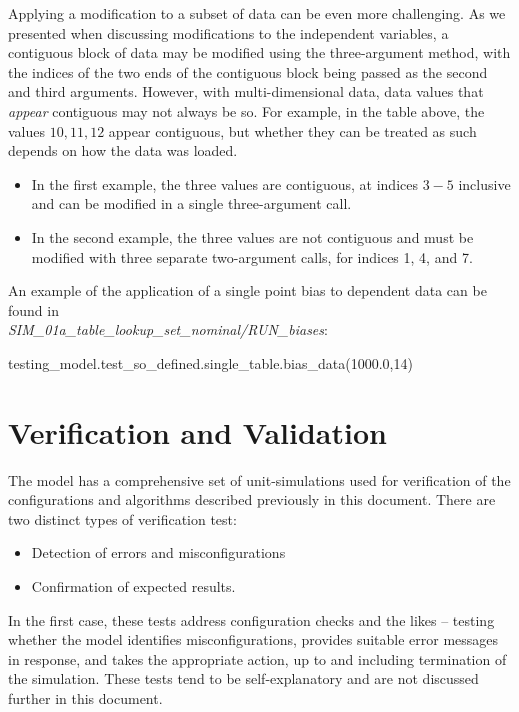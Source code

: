 \documentclass[11pt,fleqn]{report}
\begin{document}
Applying a modification to a subset of data can be even more challenging.
As we presented when discussing modifications to the independent variables,
a contiguous block of data may be modified using the three-argument method,
with the indices of the two ends of the contiguous block being passed as the
second and third arguments.  However, with multi-dimensional data,
data values that \textit{appear} contiguous may not always be so.
For example, in the table above, the
values ${10,11,12}$ appear contiguous, but whether they can be treated
as such depends on how the data was loaded.
\begin{itemize}
\item In the first example, the three values are contiguous, at indices
$3-5$ inclusive and
can be modified in a single three-argument call.
\item In the second example, the three values are not contiguous and must
be modified
with three separate two-argument calls, for indices 1, 4, and 7.
\end{itemize}

An example of the application of a single point bias to dependent data can
be found in\\
\textit{SIM\_01a\_table\_lookup\_set\_nominal/RUN\_biases}:
\begin{code}
testing_model.test_so_defined.single_table.bias_data(1000.0,14)
\end{code}



\chapter {Verification and Validation}

The model has a comprehensive set of unit-simulations used for verification of
the configurations and algorithms described previously in this document.
There are two distinct types of verification test:
\begin{itemize}
 \item Detection of errors and misconfigurations
 \item Confirmation of expected results.
\end{itemize}

In the first case, these
tests address configuration checks and the likes -- testing whether the model
identifies misconfigurations, provides suitable error messages in response,
and takes the appropriate action, up to and including termination of the
simulation.  These tests tend to be self-explanatory and are not discussed
further in this document.
\end{document}

